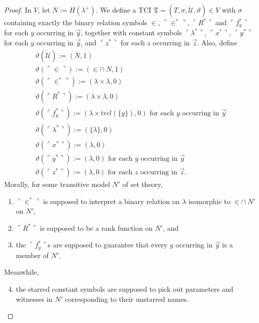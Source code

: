 \documentclass[12pt, twoside]{memoir}
\numberwithin{equation}{section}
\theoremstyle{definition}
\theoremstyle{remark}
\theoremstyle{definition}
\theoremstyle{definition}
\theoremstyle{definition}
\theoremstyle{remark}
\begin{document}
\begin{proof}
In $V$, let $N := H(\lambda^+)$. We define a TCI $\mathfrak{T} = (T, \sigma, \dot{\mathcal{U}}, \vartheta) \in V$ with $\sigma$ containing exactly the binary relation symbols $\in$, $\ulcorner \in^* \urcorner$, $\ulcorner R^* \urcorner$ and $\ulcorner f_y^* \urcorner$ for each $y$ occurring in $\Vec{y}$, together with constant symbols $\ulcorner \lambda^* \urcorner$, $\ulcorner x^* \urcorner$, $\ulcorner y^* \urcorner$ for each $y$ occurring in $\Vec{y}$, and $\ulcorner z^* \urcorner$ for each $z$ occurring in $\Vec{z}$. Also, define
\begin{gather*}
    \vartheta (\dot{\mathcal{U}}) := (N, 1) \\
    \vartheta (\ulcorner \in \urcorner) := (\in \cap \ N, 1) \\
    \vartheta (\ulcorner \in^* \urcorner) := (\lambda \times \lambda, 0) \\
    \vartheta (\ulcorner R^* \urcorner) := (\lambda \times \lambda, 0) \\
    \vartheta (\ulcorner f_y^* \urcorner) := (\lambda \times trcl(\{y\}), 0) \text{ for each } y \text{ occurring in } \Vec{y} \\
    \vartheta (\ulcorner \lambda^* \urcorner) := (\{\lambda\}, 0) \\
    \vartheta (\ulcorner x^* \urcorner) := (\lambda, 0) \\
    \vartheta (\ulcorner y^* \urcorner) := (\lambda, 0) \text{ for each } y \text{ occurring in } \Vec{y} \\
    \vartheta (\ulcorner z^* \urcorner) := (\lambda, 0) \text{ for each } z \text{ occurring in } \Vec{z} \text{.}
\end{gather*}
Morally, for some transitive model $N'$ of set theory,
\begin{enumerate}[label=(\Alph*)]
    \item\label{9419A} $\ulcorner \in^* \urcorner$ is supposed to interpret a binary relation on $\lambda$ isomorphic to $\in \cap \ N'$ on $N'$, 
    \item\label{9419B} $\ulcorner R^* \urcorner$ is supposed to be a rank function on $N'$, and 
    \item\label{9419C} the $\ulcorner f_y^* \urcorner$s are supposed to guarantee that every $y$ occurring in $\Vec{y}$ is a member of $N'$.
\end{enumerate}
Meanwhile, 
\begin{enumerate}[label=(\Alph*)]
    \setcounter{enumi}{3}
    \item\label{9419D} the starred constant symbols are supposed to pick out parameters and witnesses in $N'$ corresponding to their unstarred names.
\end{enumerate}


\end{proof}
\end{document}
